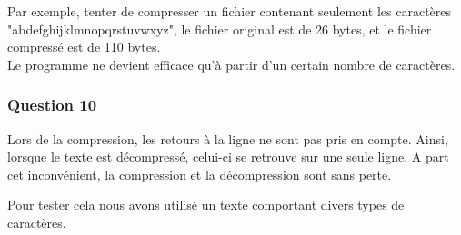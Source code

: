 \documentclass[a4paper]{article}
\begin{document}
Par exemple, tenter de compresser un fichier contenant seulement les caractères "abdefghijklmnopqrstuvwxyz", le fichier original est de 26 bytes, et le fichier compressé est de 110 bytes. 
\\
Le programme ne devient efficace qu'à partir d'un certain nombre de caractères. 

\subsubsection*{Question 10}
Lors de la compression, les retours à la ligne ne sont pas pris en compte. Ainsi, lorsque le texte est décompressé, celui-ci se retrouve sur une seule ligne. A part cet inconvénient, la compression et la décompression sont sans perte. 

Pour tester cela nous avons utilisé un texte comportant divers types de caractères. 
\end{document}
